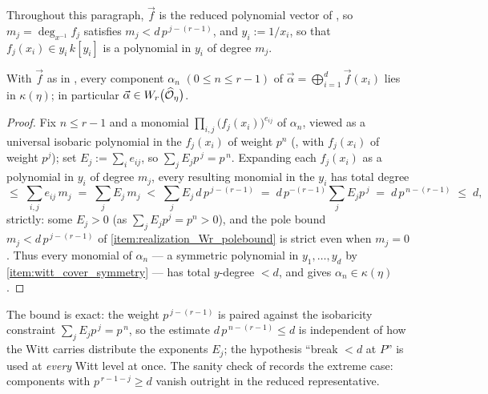 Throughout this paragraph, $\vec f$ is the reduced polynomial vector of
, so $m_j = \deg_{x^{-1}} f_j$ satisfies
$m_j < d\, p^{\,j-(r-1)}$, and $y_i := 1/x_i$, so that $f_j(x_i) \in y_i\, k[y_i]$ is
a polynomial in $y_i$ of degree $m_j$.

\begin{theorem}\label{theorem:witt_components_regularity}
    With $\vec f$ as in , every component
    $\alpha_n$ $(0 \leq n \leq r-1)$ of
    $\vec \alpha = \bigoplus_{i=1}^{d} \vec f(x_i)$ lies in $\kappa(\eta)$; in
    particular $\vec \alpha \in W_r\bigl(\widehat{\mathcal{O}}_\eta\bigr)$.
\end{theorem}

\begin{proof}
    Fix $n \leq r-1$ and a monomial $\prod_{i,j} \bigl(f_j(x_i)\bigr)^{e_{ij}}$ of
    $\alpha_n$, viewed as a universal isobaric polynomial in the $f_j(x_i)$ of
    weight $p^n$ (, with $f_j(x_i)$ of weight
    $p^j$); set $E_j := \sum_i e_{ij}$, so $\sum_j E_j p^{\,j} = p^{\,n}$. Expanding
    each $f_j(x_i)$ as a polynomial in $y_i$ of degree $m_j$, every resulting
    monomial in the $y_i$ has total degree
    \[
    \leq\; \sum_{i,j} e_{ij}\, m_j \;=\; \sum_j E_j\, m_j
    \;<\; \sum_j E_j\, d\, p^{\,j-(r-1)}
    \;=\; d\, p^{-(r-1)} \sum_j E_j p^{\,j}
    \;=\; d\, p^{\,n-(r-1)} \;\leq\; d,
    \]
    strictly: some $E_j > 0$ (as $\sum_j E_j p^j = p^n > 0$), and the pole bound
    $m_j < d\, p^{\,j-(r-1)}$ of
    \ref{item:realization_Wr_polebound} is strict
    even when $m_j = 0$. Thus every monomial of $\alpha_n$ --- a symmetric polynomial
    in $y_1, \dots, y_d$ by
    \ref{item:witt_cover_symmetry} --- has total
    $y$-degree $< d$, and  gives
    $\alpha_n \in \kappa(\eta)$.
\end{proof}

\begin{rem*}
    The bound is exact: the weight $p^{\,j-(r-1)}$ is paired against the isobaricity
    constraint $\sum_j E_j p^{\,j} = p^{\,n}$, so the estimate
    $d\, p^{\,n-(r-1)} \leq d$ is independent of how the Witt carries distribute the
    exponents $E_j$; the hypothesis ``break $< d$ at $P$'' is used at \emph{every}
    Witt level at once. The sanity check of
     records the extreme case: components with
    $p^{\,r-1-j} \geq d$ vanish outright in the reduced representative.
\end{rem*}

